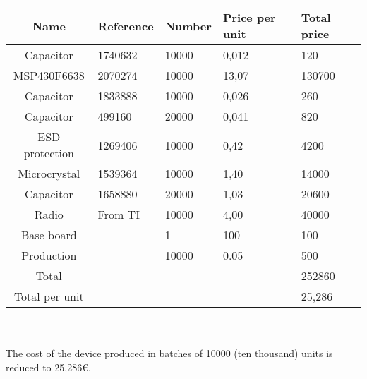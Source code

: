 \begin{tabular}{| c |l | l | l | l |} 
		\hline
		Name & Reference & Number & Price per unit & Total price\\ \hline
	 	Capacitor & 1740632 & 10000 & 0,012  & 120\\ \hline
	 	MSP430F6638 & 2070274 & 10000 & 13,07 & 130700\\ \hline
	 	Capacitor & 1833888 & 10000 & 0,026  & 260\\ \hline
	 	Capacitor & 499160 & 20000 & 0,041  & 820\\ \hline
	 	ESD protection & 1269406 & 10000 & 0,42  & 4200\\ \hline
	 	Microcrystal & 1539364 & 10000 & 1,40 & 14000\\ \hline
	 	Capacitor & 1658880 & 20000 & 1,03  & 20600\\ \hline
	 	Radio & From TI & 10000 & 4,00 & 40000\\ \hline
		Base board &  & 1 & 100 & 100\\ \hline
		Production &  & 10000 & 0.05 & 500\\ \hline
	 	Total &  &  &  & 252860\\ \hline
	 	Total per unit &  &  &  & 25,286\\
	\hline
\end{tabular}\\\\

	The cost of the device produced in batches of 10000 (ten thousand) units is reduced to 25,286{\small \euro}.